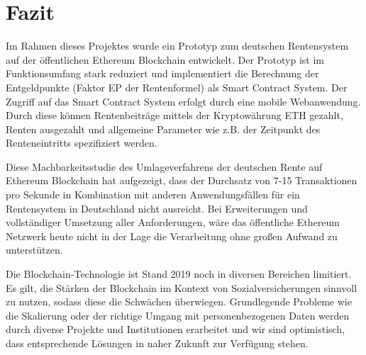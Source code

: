 \section{Fazit}
Im Rahmen dieses Projektes wurde ein Prototyp zum deutschen Rentensystem auf der öffentlichen Ethereum Blockchain entwickelt. Der Prototyp ist im Funktionsumfang stark reduziert und implementiert die Berechnung der Entgeldpunkte (Faktor EP der Rentenformel) als Smart Contract System. Der Zugriff auf das Smart Contract System erfolgt durch eine mobile Webanwendung. Durch diese können Rentenbeiträge mittels der Kryptowährung ETH gezahlt, Renten ausgezahlt und allgemeine Parameter wie z.B. der Zeitpunkt des Renteneintritts spezifiziert werden.

Diese Machbarkeitsstudie des Umlageverfahrens der deutschen Rente auf Ethereum Blockchain hat aufgezeigt, dass der Durchsatz von 7-15 Transaktionen pro Sekunde in Kombination mit anderen Anwendungsfällen für ein Rentensystem in Deutschland nicht ausreicht. Bei Erweiterungen und vollständiger Umsetzung aller Anforderungen, wäre das öffentliche Ethereum Netzwerk heute nicht in der Lage die Verarbeitung ohne großen Aufwand zu unterstützen.

Die Blockchain-Technologie ist Stand 2019 noch in diversen Bereichen limitiert. Es gilt, die Stärken der Blockchain im Kontext von Sozialversicherungen sinnvoll zu nutzen, sodass diese die Schwächen überwiegen. Grundlegende Probleme wie die Skalierung oder der richtige Umgang mit personenbezogenen Daten werden durch diverse Projekte und Institutionen erarbeitet und wir sind optimistisch, dass entsprechende Lösungen in naher Zukunft zur Verfügung stehen.



